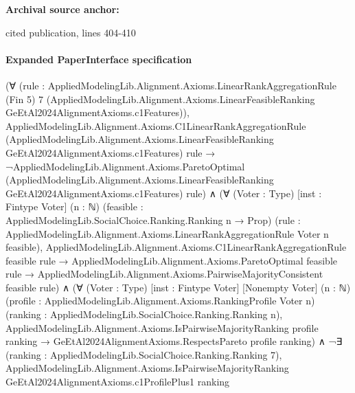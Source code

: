 \documentclass[10pt]{article}
\begin{document}
\textbf{Archival source anchor:} {\footnotesize\raggedright cited publication, lines 404-\allowbreak{}410\par}
\paragraph{Expanded PaperInterface specification}
\begin{ReviewVerbatim}
(∀
    (rule :
      AppliedModelingLib.Alignment.Axioms.LinearRankAggregationRule (Fin 5) 7
        (AppliedModelingLib.Alignment.Axioms.LinearFeasibleRanking GeEtAl2024AlignmentAxioms.c1Features)),
    AppliedModelingLib.Alignment.Axioms.C1LinearRankAggregationRule
        (AppliedModelingLib.Alignment.Axioms.LinearFeasibleRanking GeEtAl2024AlignmentAxioms.c1Features) rule →
      ¬AppliedModelingLib.Alignment.Axioms.ParetoOptimal
          (AppliedModelingLib.Alignment.Axioms.LinearFeasibleRanking GeEtAl2024AlignmentAxioms.c1Features) rule) ∧
  (∀ (Voter : Type) [inst : Fintype Voter] (n : ℕ) (feasible : AppliedModelingLib.SocialChoice.Ranking.Ranking n → Prop)
      (rule : AppliedModelingLib.Alignment.Axioms.LinearRankAggregationRule Voter n feasible),
      AppliedModelingLib.Alignment.Axioms.C1LinearRankAggregationRule feasible rule →
        AppliedModelingLib.Alignment.Axioms.ParetoOptimal feasible rule →
          AppliedModelingLib.Alignment.Axioms.PairwiseMajorityConsistent feasible rule) ∧
    (∀ (Voter : Type) [inst : Fintype Voter] [Nonempty Voter] (n : ℕ)
        (profile : AppliedModelingLib.Alignment.Axioms.RankingProfile Voter n)
        (ranking : AppliedModelingLib.SocialChoice.Ranking.Ranking n),
        AppliedModelingLib.Alignment.Axioms.IsPairwiseMajorityRanking profile ranking →
          GeEtAl2024AlignmentAxioms.RespectsPareto profile ranking) ∧
      ¬∃ (ranking : AppliedModelingLib.SocialChoice.Ranking.Ranking 7),
          AppliedModelingLib.Alignment.Axioms.IsPairwiseMajorityRanking GeEtAl2024AlignmentAxioms.c1ProfilePlus1 ranking
\end{ReviewVerbatim}
\end{document}
